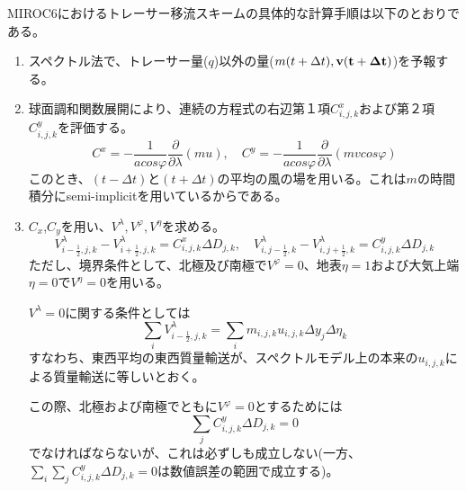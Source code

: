 \documentclass{jsbook}
\begin{document}
MIROC6におけるトレーサー移流スキームの具体的な計算手順は以下のとおりである。
\begin{enumerate}
\item スペクトル法で、トレーサー量($q$)以外の量($m(t+\Delta t), \bf{v}(t+\Delta t)$)を予報する。
\item 球面調和関数展開により、連続の方程式の右辺第１項$C^{x}_{i,j,k}$および第２項$C^{y}_{i,j,k}$を評価する。
  \begin{equation}
    C^{x}=-\frac{1}{a cos \varphi}\frac{\partial}{\partial \lambda}(mu),\quad C^{y}=-\frac{1}{a cos \varphi}\frac{\partial}{\partial \lambda}(mv cos \varphi) 
  \end{equation}
  このとき、$(t-\Delta t)$と$(t+\Delta t)$の平均の風の場を用いる。これは$m$の時間積分にsemi-implicitを用いているからである。
\item $C_{x}$,$C_{y}$を用い、$V^{\lambda}, V^{\varphi}, V^{\eta}$を求める。
  \begin{equation}
    V^{\lambda}_{i-\frac{1}{2},j,k}-V^{\lambda}_{i+\frac{1}{2},j,k}=C^{x}_{i,j,k}\Delta D_{j,k}, \quad V^{\lambda}_{i,j-\frac{1}{2},k}-V^{\lambda}_{i,j+\frac{1}{2},k}=C^{y}_{i,j,k}\Delta D_{j,k}
  \end{equation}
  ただし、境界条件として、北極及び南極で$V^{\varphi}=0$、地表$\eta=1$および大気上端$\eta=0$で$V^{\eta}=0$を用いる。

  $V^{\lambda}=0$に関する条件としては
  \begin{equation}
    \sum_{i}V^{\lambda}_{i-\frac{1}{2},j,k}=\sum_{i}m_{i,j,k}u_{i,j,k}\Delta y_{j}\Delta \eta_{k}
  \end{equation}
  すなわち、東西平均の東西質量輸送が、スペクトルモデル上の本来の$u_{i,j,k}$による質量輸送に等しいとおく。

  この際、北極および南極でともに$V^{\varphi}=0$とするためには
  \begin{equation}
    \sum_{j}C^{y}_{i,j,k}\Delta D_{j,k}=0
  \end{equation}
  でなければならないが、これは必ずしも成立しない(一方、$\sum_{i} \sum_{j}C^{y}_{i,j,k}\Delta D_{j,k}=0$は数値誤差の範囲で成立する)。


\end{enumerate}
\end{document}
